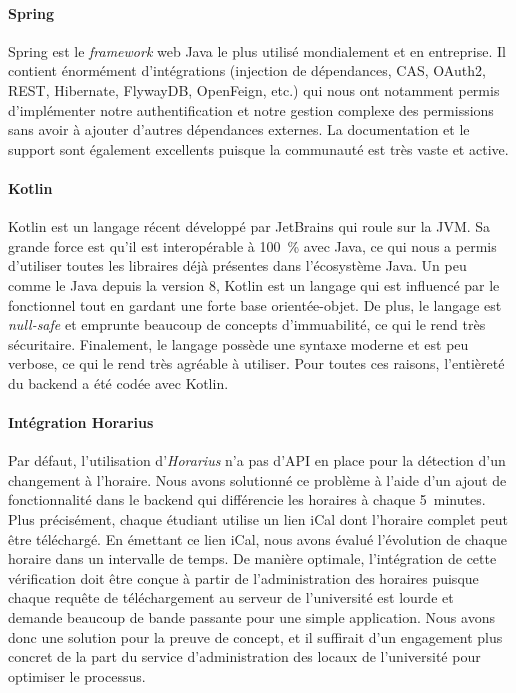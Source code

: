         \paragraph{Spring}
        Spring est le \emph{framework} web Java le plus utilisé mondialement et en entreprise. Il contient énormément d'intégrations (injection de dépendances, CAS, OAuth2, REST, Hibernate, FlywayDB, OpenFeign, etc.) qui nous ont notamment permis d'implémenter notre authentification et notre gestion complexe des permissions sans avoir à ajouter d'autres dépendances externes. La documentation et le support sont également excellents puisque la communauté est très vaste et active.
        
        \paragraph{Kotlin}
        Kotlin est un langage récent développé par JetBrains qui roule sur la JVM. Sa grande force est qu'il est interopérable à 100~\% avec Java, ce qui nous a permis d'utiliser toutes les libraires déjà présentes dans l'écosystème Java. Un peu comme le Java depuis la version 8, Kotlin est un langage qui est influencé par le fonctionnel tout en gardant une forte base orientée-objet. De plus, le langage est \emph{null-safe} et emprunte beaucoup de concepts d'immuabilité, ce qui le rend très sécuritaire. Finalement, le langage possède une syntaxe moderne et est peu verbose, ce qui le rend très agréable à utiliser. Pour toutes ces raisons, l'entièreté du backend a été codée avec Kotlin.

        \paragraph{Intégration Horarius}
        Par défaut, l'utilisation d'\emph{Horarius} n'a pas d'API en place pour la détection d'un changement à l'horaire. Nous avons solutionné ce problème à l'aide d'un ajout de fonctionnalité dans le backend qui différencie les horaires à chaque 5~minutes. Plus précisément, chaque étudiant utilise un lien iCal dont l'horaire complet peut être téléchargé. En émettant ce lien iCal, nous avons évalué l'évolution de chaque horaire dans un intervalle de temps. De manière optimale, l'intégration de cette vérification doit être conçue à partir de l'administration des horaires puisque chaque requête de téléchargement au serveur de l'université est lourde et demande beaucoup de bande passante pour une simple application. Nous avons donc une solution pour la preuve de concept, et il suffirait d'un engagement plus concret de la part du service d'administration des locaux de l'université pour optimiser le processus.

